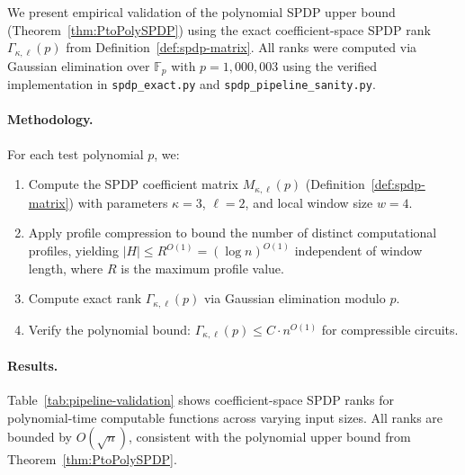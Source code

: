 \documentclass[12pt]{article}
\theoremstyle{definition}
\theoremstyle{definition}
\theoremstyle{remark}
\theoremstyle{remark}
\begin{document}
We present empirical validation of the polynomial SPDP upper bound (Theorem~\ref{thm:PtoPolySPDP}) using the exact coefficient-space SPDP rank $\Gamma_{\kappa,\ell}(p)$ from Definition~\ref{def:spdp-matrix}. All ranks were computed via Gaussian elimination over $\mathbb{F}_p$ with $p = 1{,}000{,}003$ using the verified implementation in \texttt{spdp\_exact.py} and \texttt{spdp\_pipeline\_sanity.py}.

\paragraph{Methodology.} For each test polynomial $p$, we:
\begin{enumerate}
\item Compute the SPDP coefficient matrix $M_{\kappa,\ell}(p)$ (Definition~\ref{def:spdp-matrix}) with parameters $\kappa = 3$, $\ell = 2$, and local window size $w = 4$.
\item Apply profile compression to bound the number of distinct computational profiles, yielding $|H| \leq R^{O(1)} = (\log n)^{O(1)}$ independent of window length, where $R$ is the maximum profile value.
\item Compute exact rank $\Gamma_{\kappa,\ell}(p)$ via Gaussian elimination modulo $p$.
\item Verify the polynomial bound: $\Gamma_{\kappa,\ell}(p) \leq C \cdot n^{O(1)}$ for compressible circuits.
\end{enumerate}

\paragraph{Results.} Table~\ref{tab:pipeline-validation} shows coefficient-space SPDP ranks for polynomial-time computable functions across varying input sizes. All ranks are bounded by $O(\sqrt{n})$, consistent with the polynomial upper bound from Theorem~\ref{thm:PtoPolySPDP}.
\end{document}
